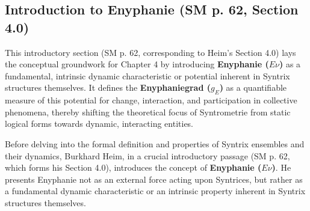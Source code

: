 \documentclass[12pt]{article}
\newcommand{\enyphaniegrad}{g_E}
\begin{document}
\subsection{Introduction to Enyphanie (SM p. 62, Section 4.0)}
\label{sec:enyphanie_intro}

This introductory section (SM p. 62, corresponding to Heim's Section 4.0) lays the conceptual groundwork for Chapter 4 by introducing \textbf{Enyphanie (\(E\nu\))} as a fundamental, intrinsic dynamic characteristic or potential inherent in Syntrix structures themselves. It defines the \textbf{Enyphaniegrad (\(\enyphaniegrad\))} as a quantifiable measure of this potential for change, interaction, and participation in collective phenomena, thereby shifting the theoretical focus of Syntrometrie from static logical forms towards dynamic, interacting entities.

Before delving into the formal definition and properties of Syntrix ensembles and their dynamics, Burkhard Heim, in a crucial introductory passage (SM p. 62, which forms his Section 4.0), introduces the concept of \textbf{Enyphanie (\(E\nu\))}. He presents Enyphanie not as an external force acting upon Syntrices, but rather as a fundamental dynamic characteristic or an intrinsic property inherent in Syntrix structures themselves.
\end{document}
